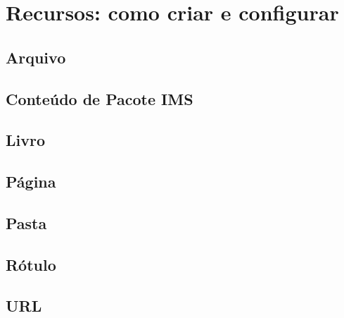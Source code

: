 \chapter{Recursos: como criar e configurar}

\section{Arquivo}

\section{Conteúdo de Pacote IMS}

\section{Livro}

\section{Página}

\section{Pasta}

\section{Rótulo}

\section{URL}